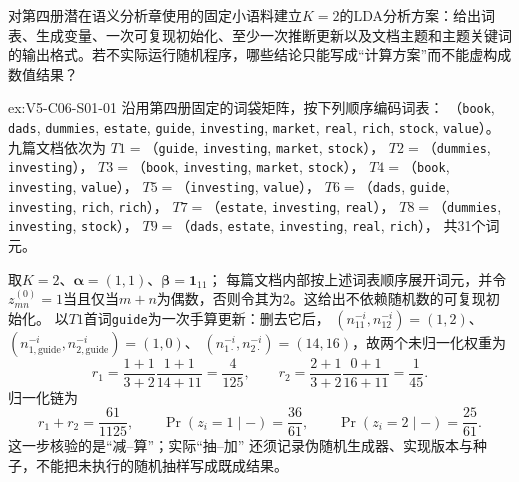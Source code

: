 \begin{SLChapterExercisePairSection}

\SLSourceBookExercises

\begin{exercise}\label{ex:V5-C06-S01-01}
对第四册潜在语义分析章使用的固定小语料建立$K=2$的LDA分析方案：给出词表、生成变量、一次可复现初始化、至少一次推断更新以及文档主题和主题关键词的输出格式。若不实际运行随机程序，哪些结论只能写成“计算方案”而不能虚构成数值结果？
\end{exercise}
\ifSLFullEdition
{}\label{sol:V5-C06-S01-01}
\begin{chapterexercisesolution}{ex:V5-C06-S01-01}
\nopagebreak[4]
沿用第四册固定的词袋矩阵，按下列顺序编码词表：
（\texttt{book}, \texttt{dads}, \texttt{dummies}, \texttt{estate},
\texttt{guide}, \texttt{investing}, \texttt{market}, \texttt{real},
\texttt{rich}, \texttt{stock}, \texttt{value}）。九篇文档依次为
$T1=$（\texttt{guide}, \texttt{investing}, \texttt{market}, \texttt{stock}），
$T2=$（\texttt{dummies}, \texttt{investing}），
$T3=$（\texttt{book}, \texttt{investing}, \texttt{market}, \texttt{stock}），
$T4=$（\texttt{book}, \texttt{investing}, \texttt{value}），
$T5=$（\texttt{investing}, \texttt{value}），
$T6=$（\texttt{dads}, \texttt{guide}, \texttt{investing}, \texttt{rich}, \texttt{rich}），
$T7=$（\texttt{estate}, \texttt{investing}, \texttt{real}），
$T8=$（\texttt{dummies}, \texttt{investing}, \texttt{stock}），
$T9=$（\texttt{dads}, \texttt{estate}, \texttt{investing}, \texttt{real}, \texttt{rich}），
共31个词元。

取$K=2$、$\boldsymbol\alpha=(1,1)$、$\boldsymbol\beta=\boldsymbol1_{11}$；
每篇文档内部按上述词表顺序展开词元，并令
$z_{mn}^{(0)}=1$当且仅当$m+n$为偶数，否则令其为2。这给出不依赖随机数的可复现初始化。
以$T1$首词\texttt{guide}为一次手算更新：删去它后，
$(n_{11}^{-i},n_{12}^{-i})=(1,2)$、
$(n_{1,\mathrm{guide}}^{-i},n_{2,\mathrm{guide}}^{-i})=(1,0)$、
$(n_{1\cdot}^{-i},n_{2\cdot}^{-i})=(14,16)$，故两个未归一化权重为
\[
r_1=\frac{1+1}{3+2}\frac{1+1}{14+11}=\frac4{125},\qquad
r_2=\frac{2+1}{3+2}\frac{0+1}{16+11}=\frac1{45}.
\]
归一化链为
\[
r_1+r_2=\frac{61}{1125},\qquad
\Pr(z_i=1\mid-)=\frac{36}{61},\qquad
\Pr(z_i=2\mid-)=\frac{25}{61}.
\]
这一步核验的是“减--算”；实际“抽--加”
还须记录伪随机生成器、实现版本与种子，不能把未执行的随机抽样写成既成结果。


\end{chapterexercisesolution}
\end{SLChapterExercisePairSection}

